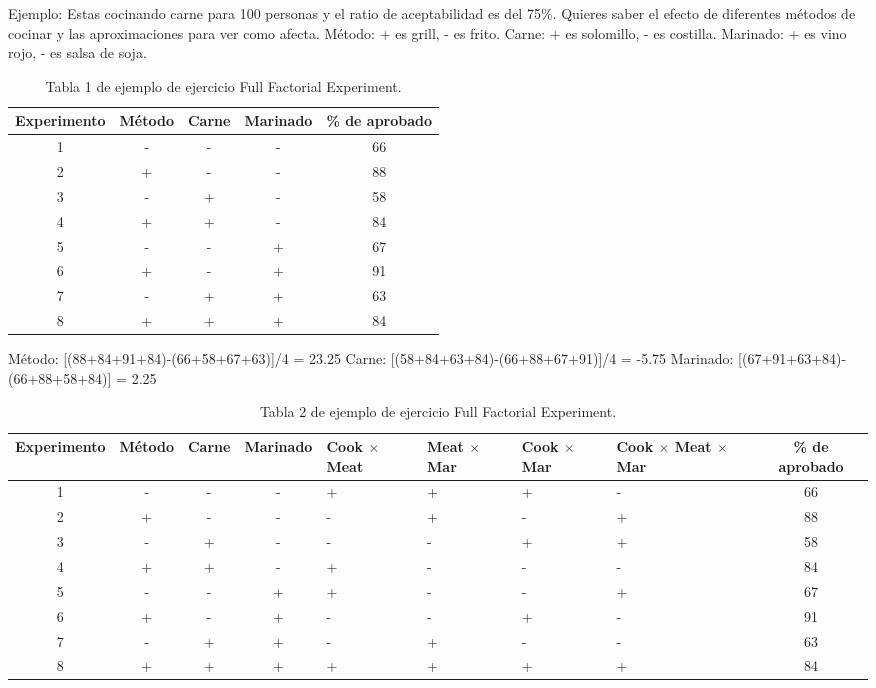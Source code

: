 \documentclass[]{article}
\begin{document}
Ejemplo: Estas cocinando carne para 100 personas y el ratio de aceptabilidad es del 75\%. Quieres saber el efecto de diferentes métodos de cocinar y las aproximaciones para ver como afecta.
Método: + es grill, - es frito. Carne: + es solomillo, - es costilla. Marinado: + es vino rojo, - es salsa de soja.

\begin{table}[H]
	\begin{center}
\begin{tabular}{|c|c|c|c|c|}
	\hline Experimento & Método & Carne & Marinado & \% de aprobado \\ 
	\hline 1 & - & - & - & 66 \\ 
	\hline 2 & + & - & - & 88 \\ 
	\hline 3 & - & + & - & 58 \\ 
	\hline 4 & + & + & - & 84 \\ 
	\hline 5 & - & - & + & 67 \\ 
	\hline 6 & + & - & + & 91 \\ 
	\hline 7 & - & + & + & 63 \\ 
	\hline 8 & + & + & + & 84 \\ 
	\hline 
\end{tabular} 
		\caption{Tabla 1 de ejemplo de ejercicio Full Factorial Experiment.}
		\end{center}
\end{table}

Método: [(88+84+91+84)-(66+58+67+63)]/4 = 23.25 \newline
Carne: [(58+84+63+84)-(66+88+67+91)]/4 = -5.75 \newline
Marinado: [(67+91+63+84)-(66+88+58+84)] = 2.25


\begin{table}[H]
	\begin{center}
		\begin{tabular}{|c|c|c|c|p{1.5cm}|p{1.5cm}|p{1.5cm}|p{1.8cm}|c|}
			\hline Experimento & Método & Carne & Marinado & Cook $\times$ Meat & Meat $\times$ Mar & Cook $\times$ Mar & Cook $\times$ Meat $\times$ Mar & \% de aprobado \\ 
			\hline 1 & - & - & - & + & + & + & - & 66 \\ 
			\hline 2 & + & - & - & - & + & - & + & 88 \\ 
			\hline 3 & - & + & - & - & - & + & + & 58 \\ 
			\hline 4 & + & + & - & + & - & - & - & 84 \\ 
			\hline 5 & - & - & + & + & - & - & + & 67 \\ 
			\hline 6 & + & - & + & - & - & + & - & 91 \\ 
			\hline 7 & - & + & + & - & + & - & - & 63 \\ 
			\hline 8 & + & + & + & + & + & + & + & 84 \\ 
			\hline 
		\end{tabular} 
		\caption{Tabla 2 de ejemplo de ejercicio Full Factorial Experiment.}
	\end{center}
\end{table}
\end{document}
